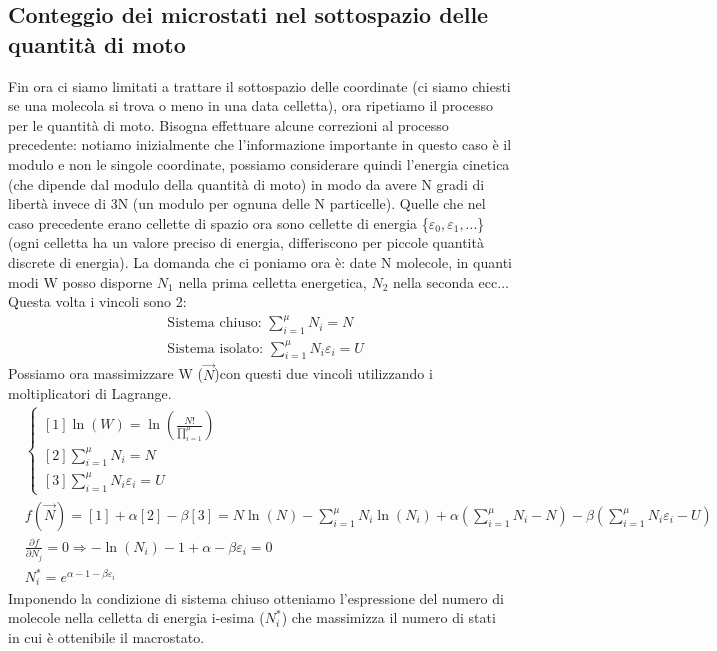 \documentclass[
10pt, %
a4paper, %
oneside, %
headinclude,footinclude, %
BCOR5mm, %
]{scrartcl}
\begin{document}
\subsection{Conteggio dei microstati nel sottospazio delle quantità di moto}
Fin ora ci siamo limitati a trattare il sottospazio delle coordinate (ci siamo chiesti se una molecola si trova o meno in una data celletta), ora ripetiamo il processo per le quantità di moto. Bisogna effettuare alcune correzioni al processo precedente: notiamo inizialmente che l'informazione importante in questo caso è il modulo e non le singole coordinate, possiamo considerare quindi l'energia cinetica (che dipende dal modulo della quantità di moto) in modo da avere N gradi di libertà invece di 3N (un modulo per ognuna delle N particelle). Quelle che nel caso precedente erano cellette di spazio ora sono cellette di energia \{\(\varepsilon_0, \varepsilon_1,...\)\} (ogni celletta ha un valore preciso di energia, differiscono per piccole quantità discrete di energia). La domanda che ci poniamo ora è: date N molecole, in quanti modi W posso disporne \(N_1\) nella prima celletta energetica, \(N_2\) nella seconda ecc... Questa volta i vincoli sono 2:
\begin{align*}
	&\text{Sistema chiuso: }\sum_{i=1}^\mu N_i = N\\
	&\text{Sistema isolato: }\sum_{i=1}^\mu N_i\varepsilon_i = U
\end{align*}
Possiamo ora massimizzare W ($\vec{N}$)con questi due vincoli utilizzando i moltiplicatori di Lagrange. 
\begin{align*}
	&\begin{cases}
		[1]\ln(W)=\ln \left(\frac{N!}{\prod_{i=1}^{\mu}}\right)\\
		[2]\sum_{i=1}^\mu N_i = N\\
		[3]\sum_{i=1}^\mu N_i\varepsilon_i = U
	\end{cases}\\
	&f(\vec{N})=[1]+\alpha[2]-\beta[3] = N\ln(N)-\sum_{i=1}^\mu N_i\ln(N_i)+\alpha(\sum_{i=1}^\mu N_i - N)-\beta(\sum_{i=1}^\mu N_i\varepsilon_i - U)\\
	&\frac{\partial f}{\partial N_j} = 0 \Rightarrow -\ln(N_i)-1+\alpha-\beta\varepsilon_i = 0\\
	&N_i^* = e^{\alpha - 1-\beta\varepsilon_i}
\end{align*}
Imponendo la condizione di sistema chiuso otteniamo l'espressione del numero di molecole nella celletta di energia i-esima (\(N_i^*\)) che massimizza il numero di stati in cui è ottenibile il macrostato.
\end{document}
